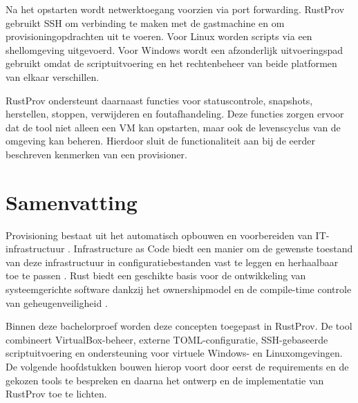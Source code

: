 Na het opstarten wordt netwerktoegang voorzien via port forwarding. RustProv gebruikt SSH om verbinding te maken met de gastmachine en om provisioningopdrachten uit te voeren. Voor Linux worden scripts via een shellomgeving uitgevoerd. Voor Windows wordt een afzonderlijk uitvoeringspad gebruikt omdat de scriptuitvoering en het rechtenbeheer van beide platformen van elkaar verschillen.

RustProv ondersteunt daarnaast functies voor statuscontrole, snapshots, herstellen, stoppen, verwijderen en foutafhandeling. Deze functies zorgen ervoor dat de tool niet alleen een VM kan opstarten, maar ook de levenscyclus van de omgeving kan beheren. Hierdoor sluit de functionaliteit aan bij de eerder beschreven kenmerken van een provisioner.

\section{Samenvatting}

Provisioning bestaat uit het automatisch opbouwen en voorbereiden van IT-infrastructuur \autocite{RedHat2026}. Infrastructure as Code biedt een manier om de gewenste toestand van deze infrastructuur in configuratiebestanden vast te leggen en herhaalbaar toe te passen \autocite{Holdsworth2025}. Rust biedt een geschikte basis voor de ontwikkeling van systeemgerichte software dankzij het ownershipmodel en de compile-time controle van geheugenveiligheid \autocite{Klabnik2018}.

Binnen deze bachelorproef worden deze concepten toegepast in RustProv. De tool combineert VirtualBox-beheer, externe TOML-configuratie, SSH-gebaseerde scriptuitvoering en ondersteuning voor virtuele Windows- en Linuxomgevingen. De volgende hoofdstukken bouwen hierop voort door eerst de requirements en de gekozen tools te bespreken en daarna het ontwerp en de implementatie van RustProv toe te lichten.